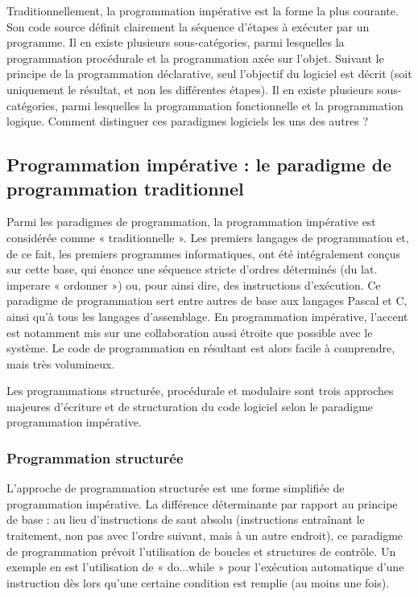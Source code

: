 \documentclass[a4paper,12pt]{article} %
\begin{document}
Traditionnellement, la programmation impérative est la forme la plus courante. Son code source définit clairement la séquence d’étapes à exécuter par un programme. Il en existe plusieurs sous-catégories, parmi lesquelles la programmation procédurale et la programmation axée sur l’objet. Suivant le principe de la programmation déclarative, seul l’objectif du logiciel est décrit (soit uniquement le résultat, et non les différentes étapes). Il en existe plusieurs sous-catégories, parmi lesquelles la programmation fonctionnelle et la programmation logique. Comment distinguer ces paradigmes logiciels les uns des autres ?

\subsection{Programmation impérative : le paradigme de programmation traditionnel} %

Parmi les paradigmes de programmation, la programmation impérative est considérée comme « traditionnelle ». Les premiers langages de programmation et, de ce fait, les premiers programmes informatiques, ont été intégralement conçus sur cette base, qui énonce une séquence stricte d’ordres déterminés (du lat. imperare « ordonner ») ou, pour ainsi dire, des instructions d’exécution. Ce paradigme de programmation sert entre autres de base aux langages Pascal et C, ainsi qu’à tous les langages d’assemblage. En programmation impérative, l’accent est notamment mis sur une collaboration aussi étroite que possible avec le système. Le code de programmation en résultant est alors facile à comprendre, mais très volumineux.

Les programmations structurée, procédurale et modulaire sont trois approches majeures d’écriture et de structuration du code logiciel selon le paradigme programmation impérative.

\subsubsection{Programmation structurée}

L’approche de programmation structurée est une forme simplifiée de programmation impérative. La différence déterminante par rapport au principe de base : au lieu d’instructions de saut absolu (instructions entraînant le traitement, non pas avec l’ordre suivant, mais à un autre endroit), ce paradigme de programmation prévoit l’utilisation de boucles et structures de contrôle. Un exemple en est l’utilisation de « do...while » pour l’exécution automatique d’une instruction dès lors qu’une certaine condition est remplie (au moins une fois).
\end{document}
